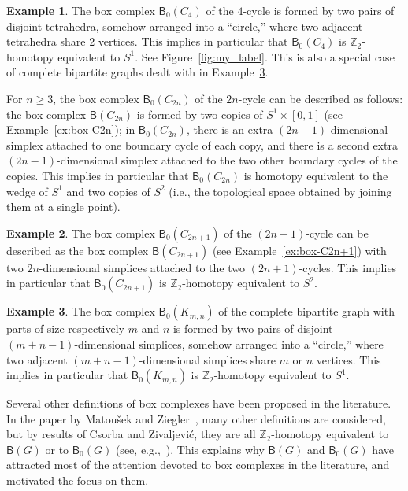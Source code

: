 \documentclass[12pt]{amsart}
\theoremstyle{definition}
\newtheorem{example}{Example}
\def\Z{\mathbb{Z}}
\def\B{\mathsf{B}}
\renewcommand{\geq}{\geqslant}
\begin{document}
\begin{example}\label{ex:box0-C2n}
    The box complex $\B_0(C_4)$ of the $4$-cycle is formed by two pairs of disjoint tetrahedra, somehow arranged into a ``circle,'' where two adjacent tetrahedra share $2$ vertices. This implies in particular that $\B_0(C_4)$ is $\Z_2$-homotopy equivalent to $S^1$. See Figure~\ref{fig:my_label}. This is also a special case of complete bipartite graphs dealt with in Example~\ref{ex:box0-bipcomplete}.

    For $n \geq 3$, the box complex $\B_0(C_{2n})$ of the $2n$-cycle can be described as follows: the box complex $\B(C_{2n})$ is formed by two copies of $S^1 \times [0,1]$ (see Example~\ref{ex:box-C2n}); in $\B_0(C_{2n})$, there is an extra $(2n-1)$-dimensional simplex attached  to one boundary cycle of each copy, and there is a second extra $(2n-1)$-dimensional simplex attached to the two other boundary cycles of the copies. This implies in particular that $\B_0(C_{2n})$ is homotopy equivalent to the wedge of $S^1$ and two copies of $S^2$ (i.e., the topological space obtained by joining them at a single point).
\end{example}


\begin{example}\label{ex:box0-C2n+1}
    The box complex $\B_0(C_{2n+1})$ of the $(2n+1)$-cycle can be described as the box complex $\B(C_{2n+1})$ (see Example~\ref{ex:box-C2n+1}) with two $2n$-dimensional simplices attached to the two $(2n+1)$-cycles. This implies in particular that $\B_0(C_{2n+1})$ is $\Z_2$-homotopy equivalent to $S^2$.
\end{example}


\begin{example}\label{ex:box0-bipcomplete}
    The box complex $\B_0(K_{m,n})$ of the complete bipartite graph with parts of size respectively $m$ and $n$ is formed by two pairs of disjoint $(m+n-1)$-dimensional simplices, somehow arranged into a ``circle,'' where two adjacent $(m+n-1)$-dimensional simplices share $m$ or $n$ vertices. This implies in particular that $\B_0(K_{m,n})$ is $\Z_2$-homotopy equivalent to $S^1$.
\end{example}




Several other definitions of box complexes have been proposed in the literature. In the paper by Matou\v sek and Ziegler~\cite{matousek2002topological}, many other definitions are considered, but by results of Csorba and  Zivaljevi\'c, they are all $\Z_2$-homotopy equivalent to $\B(G)$ or to $\B_0(G)$ (see, e.g.,~\cite{vzivaljevic2005wi}). This explains why $\B(G)$ and $\B_0(G)$ have attracted most of the attention devoted to box complexes in the literature, and motivated the focus on them.
\end{document}
